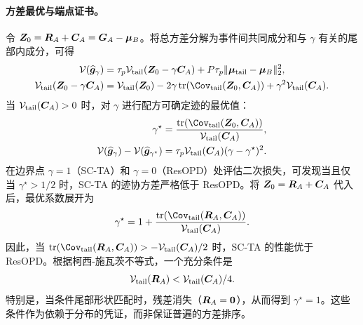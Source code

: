 \paragraph{方差最优与端点证书。}
令 $\bm{Z}_0 = \bm{R}_A + \bm{C}_A = \bm{G}_A - \bm{\mu}_B$。将总方差分解为事件间共同成分和与 $\gamma$ 有关的尾部内成分，可得
\begin{equation}
  \begin{aligned}
    \mathcal{V}(\widehat{\bgrad}_\gamma)
    &= \tau_p \mathcal{V}_{\mathrm{tail}}(\bz_0 - \gamma \bfluct_A) + P\tau_p \lVert\bmean_{\mathrm{tail}} - \bmean_B\rVert_2^2, \\
    \mathcal{V}_{\mathrm{tail}}(\bz_0 - \gamma \bfluct_A)
    &= \mathcal{V}_{\mathrm{tail}}(\bz_0) - 2\gamma \operatorname{tr}\!\left(\Cov_{\mathrm{tail}}(\bz_0, \bfluct_A)\right) + \gamma^2 \mathcal{V}_{\mathrm{tail}}(\bfluct_A).
  \end{aligned}
  \label{eq:event-scta-total-var}
\end{equation}
当 $\mathcal{V}_{\mathrm{tail}}(\bm{C}_A) > 0$ 时，对 $\gamma$ 进行配方可确定迹的最优值：
\begin{equation}
  \begin{aligned}
    \gamma^\star
    &= \frac{\operatorname{tr}\!\left(\Cov_{\mathrm{tail}}(\bz_0, \bfluct_A)\right)}{\mathcal{V}_{\mathrm{tail}}(\bfluct_A)}, \\
    \mathcal{V}(\widehat{\bgrad}_\gamma) - \mathcal{V}(\widehat{\bgrad}_{\gamma^\star})
    &= \tau_p \mathcal{V}_{\mathrm{tail}}(\bfluct_A) (\gamma - \gamma^\star)^2.
  \end{aligned}
  \label{eq:event-scta-regret}
\end{equation}
在边界点 $\gamma = 1$（SC-TA）和 $\gamma = 0$（ResOPD）处评估二次损失，可发现当且仅当 $\gamma^\star > 1/2$ 时，SC-TA 的迹协方差严格低于 ResOPD。将 $\bm{Z}_0 = \bm{R}_A + \bm{C}_A$ 代入后，最优系数展开为
\begin{equation}
  \gamma^\star = 1 + \frac{\operatorname{tr}\!\left(\Cov_{\mathrm{tail}}(\bresid_A, \bfluct_A)\right)}{\mathcal{V}_{\mathrm{tail}}(\bfluct_A)}.
  \label{eq:event-scta-gamma-residual}
\end{equation}
因此，当 $\operatorname{tr}\!\left(\Cov_{\mathrm{tail}}(\bresid_A, \bfluct_A)\right) > -\mathcal{V}_{\mathrm{tail}}(\bfluct_A)/2$ 时，SC-TA 的性能优于 ResOPD。根据柯西-施瓦茨不等式，一个充分条件是
\begin{equation}
  \mathcal{V}_{\mathrm{tail}}(\bm{R}_A) < \mathcal{V}_{\mathrm{tail}}(\bm{C}_A)/4.
  \label{eq:event-improvement}
\end{equation}
特别是，当条件尾部形状匹配时，残差消失（$\bm{R}_A = \bm{0}$），从而得到 $\gamma^\star = 1$。这些条件作为依赖于分布的凭证，而非保证普遍的方差排序。
